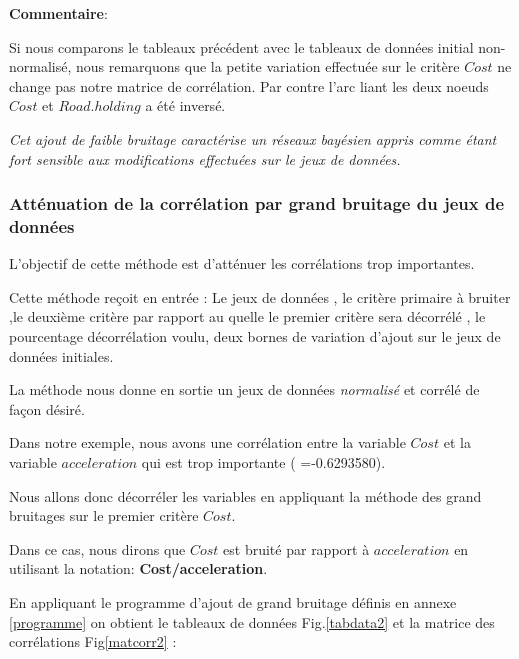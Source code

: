 \documentclass[a4paper]{article}
\begin{document}
\textbf{Commentaire}:

Si nous comparons le tableaux précédent  avec le tableaux de données initial non-normalisé, nous remarquons que la petite variation effectuée sur le critère $Cost$ ne change pas  notre matrice de corrélation. Par contre l'arc liant les deux noeuds $Cost$ et $Road.holding$ a été inversé.


\textit{Cet ajout de faible bruitage caractérise un réseaux bayésien appris comme étant  fort sensible aux modifications effectuées sur le jeux de données. }



\subsubsection{Atténuation de la corrélation par grand bruitage du jeux de données}

 L'objectif de cette méthode est d'atténuer les corrélations trop importantes.

 Cette méthode reçoit en entrée : Le jeux de données , le critère primaire à bruiter ,le deuxième critère par rapport au quelle le premier critère sera décorrélé , le pourcentage décorrélation voulu, deux bornes de variation d'ajout sur le jeux de données initiales.

La méthode nous donne en sortie  un jeux de données \textit{ normalisé}  et corrélé de façon désiré.

Dans notre exemple, nous avons une corrélation entre la variable  $Cost$ et la variable $acceleration$ qui est trop importante ( =-0.6293580).

Nous allons donc décorréler les variables  en appliquant la méthode des grand bruitages sur le premier critère $Cost$.

Dans ce cas, nous dirons que $Cost$ est bruité par rapport à $acceleration$ en utilisant la notation: \textbf{ Cost/acceleration}.

En appliquant le programme d'ajout de grand bruitage  définis en annexe \ref{programme} on obtient le tableaux de données Fig.\ref{tabdata2} et la matrice des corrélations Fig\ref{matcorr2}  :
\end{document}

